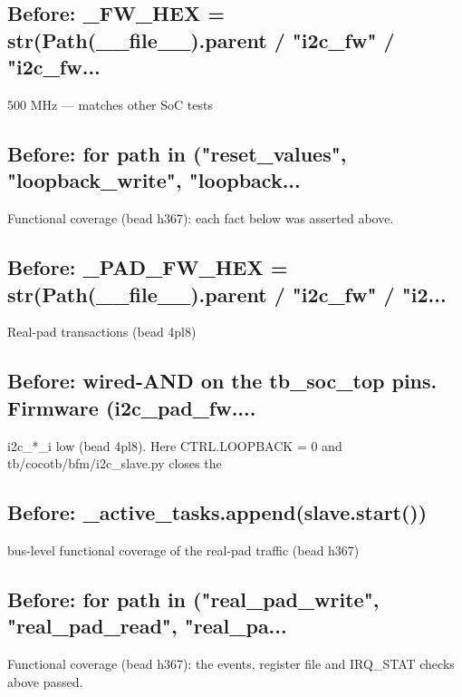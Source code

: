 \begin{record}

\subsection*{Before: \_FW\_HEX = str(Path(\_\_file\_\_).parent / "i2c\_fw" / "i2c\_fw...}

\begin{textblock}
500 MHz — matches other SoC tests
\end{textblock}

\subsection*{Before: for path in ("reset\_values", "loopback\_write", "loopback...}

\begin{textblock}
Functional coverage (bead h367): each fact below was asserted above.
\end{textblock}

\subsection*{Before: \_PAD\_FW\_HEX = str(Path(\_\_file\_\_).parent / "i2c\_fw" / "i2...}

\begin{textblock}
Real-pad transactions (bead 4pl8)
\end{textblock}

\subsection*{Before: wired-AND on the tb\_soc\_top pins.  Firmware (i2c\_pad\_fw....}

\begin{textblock}
i2c_*_i low (bead 4pl8).  Here CTRL.LOOPBACK = 0 and tb/cocotb/bfm/i2c_slave.py closes the
\end{textblock}

\subsection*{Before: \_active\_tasks.append(slave.start())}

\begin{textblock}
bus-level functional coverage of the real-pad traffic (bead h367)
\end{textblock}

\subsection*{Before: for path in ("real\_pad\_write", "real\_pad\_read", "real\_pa...}

\begin{textblock}
Functional coverage (bead h367): the events, register file and IRQ_STAT checks above passed.
\end{textblock}

\end{record}

